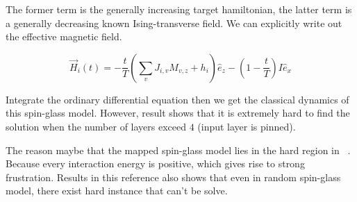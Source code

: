\documentclass[twocolumn,superscriptaddress,english,showpacs,longbibliography]{revtex4-2}
\begin{document}
The former term is the generally increasing target hamiltonian, the
latter term is a generally decreasing known Ising-transverse field. We
can explicitly write out the effective magnetic field.

\[
\vec H_{i}(t) = -\frac{t}{T}(\sum_{v}J_{i, v}M_{v,z} + h_i)\hat e_z - (1-\frac{t}{T})I\hat e_x
\]

Integrate the ordinary differential equation then we get the classical
dynamics of this spin-glass model. However, result shows that it is
extremely hard to find the solution when the number of layers exceed
$4$ (input layer is pinned).

The reason maybe that the mapped spin-glass model lies in the hard
region in ~\cite{Wang2013}. Because every interaction energy is positive, which
gives rise to strong frustration. Results in this reference also shows that even in
random spin-glass model, there exist hard instance that can't be solve.
\end{document}
